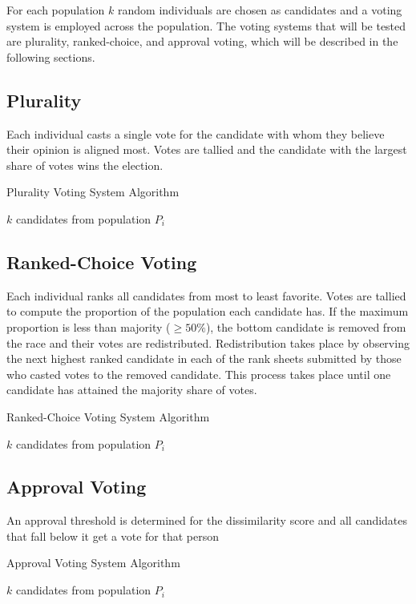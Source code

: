 
For each population $k$ random individuals are chosen as candidates and a voting system is employed across the population.
The voting systems that will be tested are plurality, ranked-choice, and approval voting, which will be described in the following sections.
\subsection{Plurality}
Each individual casts a single vote for the candidate with whom they believe their opinion is aligned most.
Votes are tallied and the candidate with the largest share of votes wins the election.
\begin{algorithm}[H]
\caption{Plurality Voting System Algorithm}\label{alg:plurality}
\begin{algorithmic}
\State \Choose $k$ candidates from population $P_i$
\end{algorithmic}
\end{algorithm}

\subsection{Ranked-Choice Voting}
Each individual ranks all candidates from most to least favorite.
Votes are tallied to compute the proportion of the population each candidate has.
If the maximum proportion is less than majority ($\geq 50\%$), the bottom candidate is removed from the race and their votes are redistributed.
Redistribution takes place by observing the next highest ranked candidate in each of the rank sheets submitted by those who casted votes
to the removed candidate. This process takes place until one candidate has attained the majority share of votes.
\begin{algorithm}[H]
\caption{Ranked-Choice Voting System Algorithm}\label{alg:ranked}
\begin{algorithmic}
\State \Choose $k$ candidates from population $P_i$
\end{algorithmic}
\end{algorithm}

\subsection{Approval Voting}
An approval threshold is determined for the dissimilarity score and all candidates that fall below it get a vote for that person
\begin{algorithm}[H]
\caption{Approval Voting System Algorithm}\label{alg:approval}
\begin{algorithmic}
\State \Choose $k$ candidates from population $P_i$
\end{algorithmic}
\end{algorithm}


